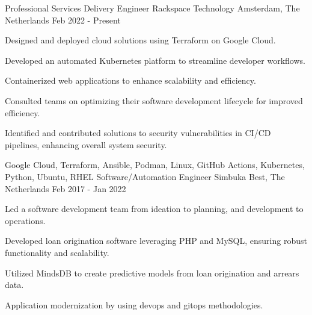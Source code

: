 

\begin{cventries}

  \cventry
    {Professional Services Delivery Engineer} %
    {Rackspace Technology} %
    {Amsterdam, The Netherlands} %
    {Feb 2022 - Present} %
    {
      \begin{cvitems} %
        \item {Designed and deployed cloud solutions using Terraform on Google Cloud.}
        \item {Developed an automated Kubernetes platform to streamline developer workflows.}
        \item {Containerized web applications to enhance scalability and efficiency.}
        \item {Consulted teams on optimizing their software development lifecycle for improved efficiency.}
        \item {Identified and contributed solutions to security vulnerabilities in CI/CD pipelines, enhancing overall system security.}
      \end{cvitems}
    }
    {Google Cloud, Terraform, Ansible, Podman, Linux, GitHub Actions, Kubernetes, Python, Ubuntu, RHEL}
  \cventry
    {Software/Automation Engineer} %
    {Simbuka} %
    {Best, The Netherlands} %
    {Feb 2017 - Jan 2022} %
    {
      \begin{cvitems} %
        \item {Led a software development team from ideation to planning, and development to operations.}
        \item {Developed loan origination software leveraging PHP and MySQL, ensuring robust functionality and scalability.}
        \item {Utilized MindsDB to create predictive models from loan origination and arrears data.}
        \item {Application modernization by using devops and gitops methodologies.}

\end{cvitems}}
\end{cventries}
